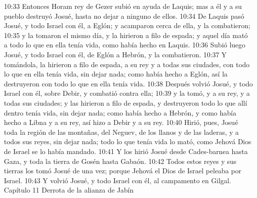 10:33 Entonces Horam rey de Gezer subió en ayuda de Laquis; mas a él y a su pueblo destruyó Josué, hasta no dejar a ninguno de ellos.  
10:34 De Laquis pasó Josué, y todo Israel con él, a Eglón; y acamparon cerca de ella, y la combatieron;  
10:35 y la tomaron el mismo día, y la hirieron a filo de espada; y aquel día mató a todo lo que en ella tenía vida, como había hecho en Laquis.  
10:36 Subió luego Josué, y todo Israel con él, de Eglón a Hebrón, y la combatieron.  
10:37 Y tomándola, la hirieron a filo de espada, a su rey y a todas sus ciudades, con todo lo que en ella tenía vida, sin dejar nada; como había hecho a Eglón, así la destruyeron con todo lo que en ella tenía vida.  
10:38 Después volvió Josué, y todo Israel con él, sobre Debir, y combatió contra ella;  
10:39 y la tomó, y a su rey, y a todas sus ciudades; y las hirieron a filo de espada, y destruyeron todo lo que allí dentro tenía vida, sin dejar nada; como había hecho a Hebrón, y como había hecho a Libna y a su rey, así hizo a Debir y a su rey.  
10:40 Hirió, pues, Josué toda la región de las montañas, del Neguev, de los llanos y de las laderas, y a todos sus reyes, sin dejar nada; todo lo que tenía vida lo mató, como Jehová Dios de Israel se lo había mandado.  
10:41 Y los hirió Josué desde Cades-barnea hasta Gaza, y toda la tierra de Gosén hasta Gabaón.  
10:42 Todos estos reyes y sus tierras los tomó Josué de una vez; porque Jehová el Dios de Israel peleaba por Israel.  
10:43 Y volvió Josué, y todo Israel con él, al campamento en Gilgal.  
Capítulo 11 
Derrota de la alianza de Jabín  

